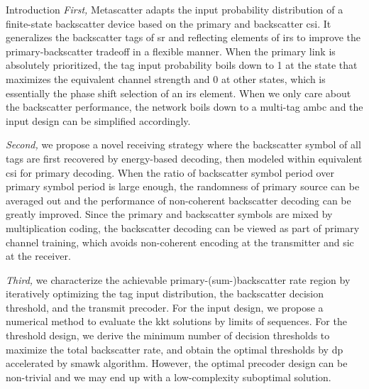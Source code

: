 \documentclass[journal]{IEEEtran}
\begin{document}
\begin{section}{Introduction}
	\emph{First,} Metascatter adapts the input probability distribution of a finite-state backscatter device based on the primary and backscatter \gls{csi}.
	It generalizes the backscatter tags of \gls{sr} and reflecting elements of \gls{irs} to improve the primary-backscatter tradeoff in a flexible manner.
	When the primary link is absolutely prioritized, the tag input probability boils down to \num{1} at the state that maximizes the equivalent channel strength and \num{0} at other states, which is essentially the phase shift selection of an \gls{irs} element.
	When we only care about the backscatter performance, the network boils down to a multi-tag \gls{ambc} and the input design can be simplified accordingly.

	\emph{Second,} we propose a novel receiving strategy where the backscatter symbol of all tags are first recovered by energy-based decoding, then modeled within equivalent \gls{csi} for primary decoding.
	When the ratio of backscatter symbol period over primary symbol period is large enough, the randomness of primary source can be averaged out and the performance of non-coherent backscatter decoding can be greatly improved.
	Since the primary and backscatter symbols are mixed by multiplication coding, the backscatter decoding can be viewed as part of primary channel training, which avoids non-coherent encoding at the transmitter and \gls{sic} at the receiver.

	\emph{Third,} we characterize the achievable primary-(sum-)backscatter rate region by iteratively optimizing the tag input distribution, the backscatter decision threshold, and the transmit precoder.
	For the input design, we propose a numerical method to evaluate the \gls{kkt} solutions by limits of sequences.
	For the threshold design, we derive the minimum number of decision thresholds to maximize the total backscatter rate, and obtain the optimal thresholds by \gls{dp} accelerated by \gls{smawk} algorithm.
	However, the optimal precoder design can be non-trivial and we may end up with a low-complexity suboptimal solution.

\end{section}
\end{document}
